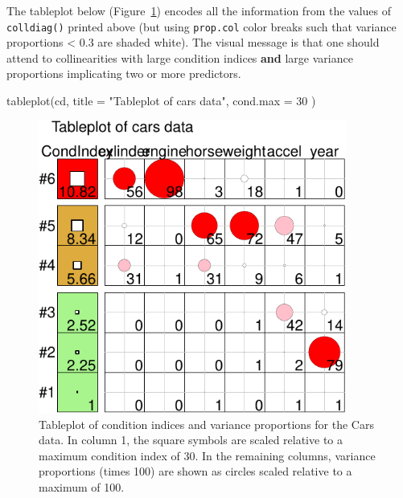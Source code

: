 \documentclass[
  letterpaper,
  10pt,
  krantz2]{krantz}
\makeatletter
\newenvironment{Shaded}{\begin{snugshade}}{\end{snugshade}}
\newcommand{\AttributeTok}[1]{\textcolor[rgb]{0.40,0.45,0.13}{#1}}
\newcommand{\DecValTok}[1]{\textcolor[rgb]{0.68,0.00,0.00}{#1}}
\newcommand{\FunctionTok}[1]{\textcolor[rgb]{0.28,0.35,0.67}{#1}}
\newcommand{\NormalTok}[1]{\textcolor[rgb]{0.00,0.23,0.31}{#1}}
\newcommand{\StringTok}[1]{\textcolor[rgb]{0.13,0.47,0.30}{#1}}
\newenvironment{kframe}{%
  \medskip{}
  \setlength{\fboxsep}{.8em}
  \def\at@end@of@kframe{}%
  \ifinner\ifhmode%
  \def\at@end@of@kframe{\end{minipage}}%
  \begin{minipage}{\columnwidth}%
  \fi\fi%
  \def\FrameCommand##1{\hskip\@totalleftmargin \hskip-\fboxsep
  \colorbox{shadecolor}{##1}\hskip-\fboxsep
      \hskip-\linewidth \hskip-\@totalleftmargin \hskip\columnwidth}%
  \MakeFramed {\advance\hsize-\width
    \@totalleftmargin\z@ \linewidth\hsize
    \@setminipage}}%
{\par\unskip\endMakeFramed%
  \at@end@of@kframe}
\renewenvironment{Shaded}{\begin{kframe}}{\end{kframe}}
\makeatother
\begin{document}
The tableplot below (Figure~\ref{fig-cars-tableplot}) encodes all the
information from the values of \texttt{colldiag()} printed above (but
using \texttt{prop.col} color breaks such that variance proportions
\textless{} 0.3 are shaded white). The visual message is that one should
attend to collinearities with large condition indices \textbf{and} large
variance proportions implicating two or more predictors.

\begin{Shaded}
\begin{Highlighting}[]
\FunctionTok{tableplot}\NormalTok{(cd, }\AttributeTok{title =} \StringTok{"Tableplot of cars data"}\NormalTok{, }\AttributeTok{cond.max =} \DecValTok{30}\NormalTok{ )}
\end{Highlighting}
\end{Shaded}

\begin{figure}[H]

{\centering \includegraphics[width=0.9\textwidth,height=\textheight]{figs/fig-cars-tableplot-1.pdf}

}

\caption{\label{fig-cars-tableplot}Tableplot of condition indices and
variance proportions for the Cars data. In column 1, the square symbols
are scaled relative to a maximum condition index of 30. In the remaining
columns, variance proportions (times 100) are shown as circles scaled
relative to a maximum of 100.}

\end{figure}
\end{document}
